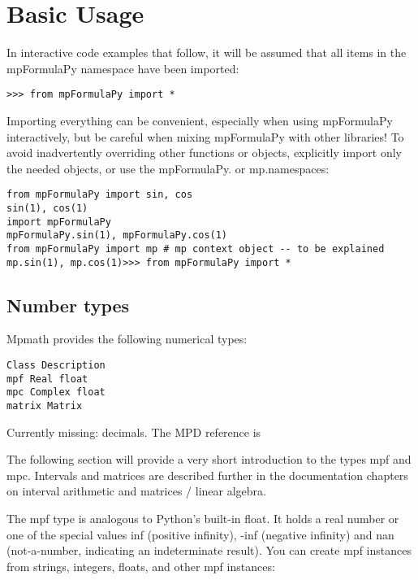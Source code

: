 \chapter{Basic Usage}





In interactive code examples that follow, it will be assumed that all items in the mpFormulaPy
namespace have been imported:

\begin{lstlisting}
>>> from mpFormulaPy import *
\end{lstlisting}

Importing everything can be convenient, especially when using mpFormulaPy interactively, but be careful when mixing mpFormulaPy with other libraries! To avoid inadvertently overriding other functions or objects, explicitly import only the needed objects, or use the mpFormulaPy. or mp.namespaces:


\begin{lstlisting}
from mpFormulaPy import sin, cos
sin(1), cos(1)
import mpFormulaPy
mpFormulaPy.sin(1), mpFormulaPy.cos(1)
from mpFormulaPy import mp # mp context object -- to be explained
mp.sin(1), mp.cos(1)>>> from mpFormulaPy import *
\end{lstlisting}



\section{Number types}
Mpmath provides the following numerical types:

\begin{verbatim}
Class Description
mpf Real float
mpc Complex float
matrix Matrix
\end{verbatim}


Currently missing: decimals. The MPD reference is \cite{mpd_2012}


The following section will provide a very short introduction to the types mpf and mpc. Intervals and matrices are described further in the documentation chapters on interval arithmetic and matrices / linear algebra.

\vpara
The mpf type is analogous to Python's built-in float. It holds a real number or one of the special values inf (positive infinity), -inf (negative infinity) and nan (not-a-number, indicating an indeterminate result). You can create mpf instances from strings, integers, floats, and
other mpf instances:

